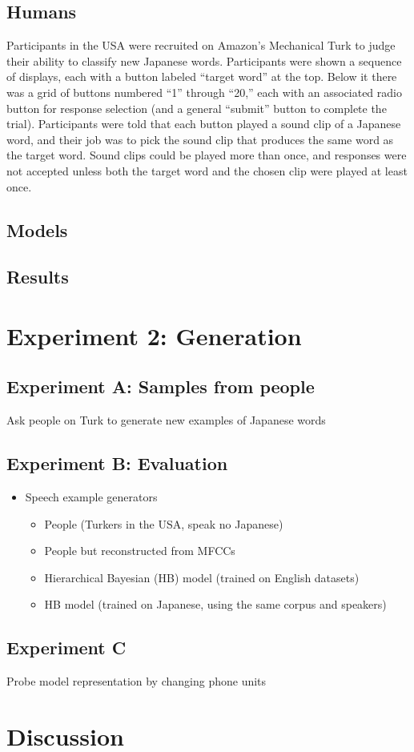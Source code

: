 \documentclass[10pt,letterpaper]{article}
\begin{document}
\subsection{Humans}
Participants in the USA were recruited on Amazon's Mechanical Turk to judge their ability to classify new Japanese words. Participants were shown a sequence of displays, each with a button labeled ``target word'' at the top. Below it there was a grid of buttons numbered ``1'' through ``20,'' each with an associated radio button for response selection (and a general ``submit'' button to complete the trial). Participants were told that each button played a sound clip of a Japanese word, and their job was to pick the sound clip that produces the same word as the target word. Sound clips could be played more than once, and responses were not accepted unless both the target word and the chosen clip were played at least once. 
\subsection{Models}
\subsection{Results}

\section{Experiment 2: Generation}

\subsection{Experiment A: Samples from people} 
Ask people on Turk to generate new examples of Japanese words

\subsection{Experiment B: Evaluation}
 
\begin{itemize}
\item Speech example generators
\begin{itemize}
	\item People (Turkers in the USA, speak no Japanese)
	\item People but reconstructed from MFCCs
	\item Hierarchical Bayesian (HB) model (trained on English datasets)
	\item HB model (trained on Japanese, using the same corpus and speakers)
\end{itemize}
\end{itemize}

\subsection{Experiment C}
Probe model representation by changing phone units

\section{Discussion}


\setlength{\bibleftmargin}{.125in}
\setlength{\bibindent}{-\bibleftmargin}


\end{document}

